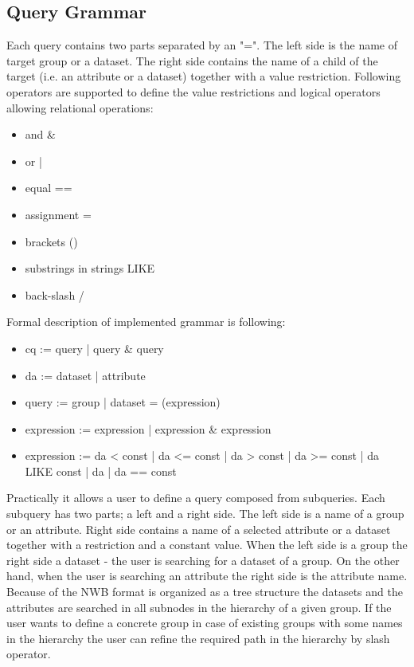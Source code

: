 \documentclass[utf8]{frontiersSCNS} %
\begin{document}
\subsection{Query Grammar}
\label{Query_Grammar}

Each query contains two parts separated by an "=". The left side is the name of target group or a dataset. The right side contains the name of a child of the target (i.e. an attribute or a dataset) together with a value restriction. Following operators are supported to define the value restrictions and logical operators allowing relational operations:

\begin{itemize}
 \item and \&
 \item or  |
 \item equal ==
 \item assignment =
 \item brackets ()
 \item substrings in strings LIKE
 \item back-slash /
\end{itemize}

Formal description of implemented grammar is following:

\begin{itemize}
\item cq := query | query \& query
\item da := dataset | attribute
\item query := group | dataset = (expression)
\item expression := expression | expression \& expression
\item expression := da < const | da <= const | da > const | da >= const | da LIKE const | da | da == const 
\end{itemize}

Practically it allows a user to define a query composed from subqueries. Each subquery has two parts; a left and a right side. The left side is a name of a group or an attribute. Right side contains a name of a selected attribute or a dataset together with a restriction and a constant value. When the left side is a group the right side a dataset - the user is searching for a dataset of a group. On the other hand, when the user is searching an attribute the right side is the attribute name. Because of the NWB format is organized as a tree structure the datasets and the attributes are searched in all subnodes in the hierarchy of a given group. If the user wants to define a concrete group in case of existing groups with some names in the hierarchy the user can refine the required path in the hierarchy by slash operator.
\end{document}
